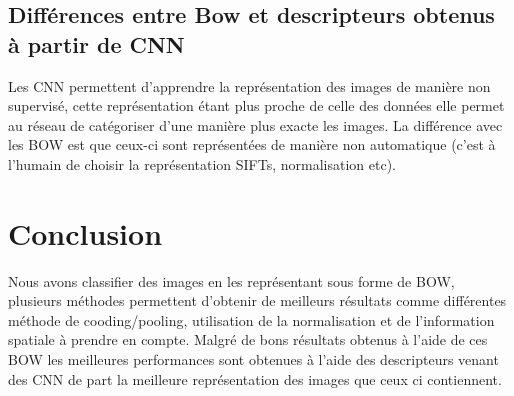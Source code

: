\documentclass[a4paper]{article}
\begin{document}
\subsection{Différences entre Bow et descripteurs obtenus à partir de CNN}
Les CNN permettent d'apprendre la représentation des images de manière non supervisé, cette représentation étant plus proche de celle des données elle permet au réseau de catégoriser d'une manière plus exacte les images. La différence avec les BOW est que ceux-ci sont représentées de manière non automatique (c'est à l'humain de choisir la représentation SIFTs, normalisation etc).  
\section{Conclusion}
Nous avons classifier des images en les représentant sous forme de BOW, plusieurs méthodes permettent d'obtenir de meilleurs résultats comme différentes méthode de cooding/pooling, utilisation de la normalisation et de l'information spatiale à prendre en compte. Malgré de bons résultats obtenus à l'aide de ces BOW les meilleures performances sont obtenues à l'aide des descripteurs venant des CNN de part la meilleure représentation des images que ceux ci contiennent.
\end{document}
